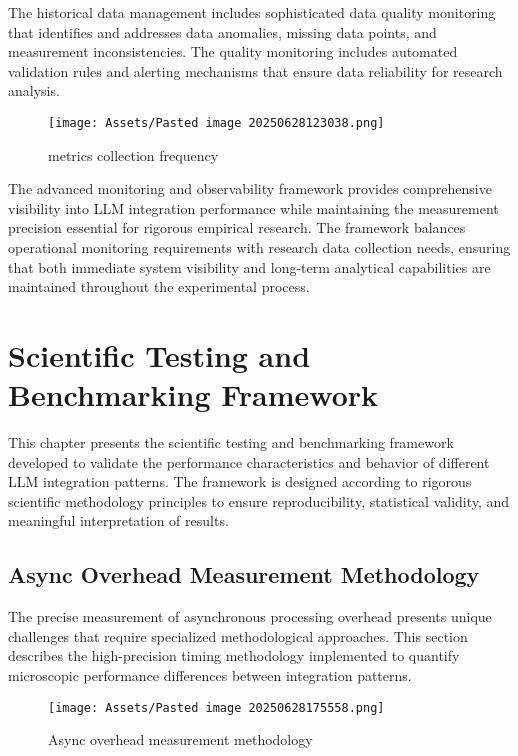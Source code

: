 
The historical data management includes sophisticated data quality monitoring that identifies and addresses data anomalies, missing data points, and measurement inconsistencies. The quality monitoring includes automated validation rules and alerting mechanisms that ensure data reliability for research analysis.

\begin{figure}[H]
    \centering
    \texttt{[image: Assets/Pasted image 20250628123038.png]}
    \caption{metrics collection frequency}
\end{figure}
The advanced monitoring and observability framework provides comprehensive visibility into LLM integration performance while maintaining the measurement precision essential for rigorous empirical research. The framework balances operational monitoring requirements with research data collection needs, ensuring that both immediate system visibility and long-term analytical capabilities are maintained throughout the experimental process.

\chapter{Scientific Testing and Benchmarking Framework}

This chapter presents the scientific testing and benchmarking framework developed to validate the performance characteristics and behavior of different LLM integration patterns. The framework is designed according to rigorous scientific methodology principles to ensure reproducibility, statistical validity, and meaningful interpretation of results.

\section{Async Overhead Measurement Methodology}

The precise measurement of asynchronous processing overhead presents unique challenges that require specialized methodological approaches. This section describes the high-precision timing methodology implemented to quantify microscopic performance differences between integration patterns.
\begin{figure}[H]
    \centering
    \texttt{[image: Assets/Pasted image 20250628175558.png]}
    \caption{Async overhead measurement methodology}
\end{figure}
